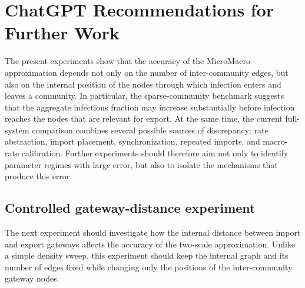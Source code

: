 \documentclass[12pt,a4paper]{article}
\begin{document}











\appendix

\section{ChatGPT Recommendations for Further Work}
\label{app:chatgpt_recommendations}

The present experiments show that the accuracy of the MicroMacro approximation depends not only on the number of inter-community edges, but also on the internal position of the nodes through which infection enters and leaves a community. In particular, the sparse-community benchmark suggests that the aggregate infectious fraction may increase substantially before infection reaches the nodes that are relevant for export. At the same time, the current full-system comparison combines several possible sources of discrepancy: rate abstraction, import placement, synchronization, repeated imports, and macro-rate calibration. Further experiments should therefore aim not only to identify parameter regimes with large error, but also to isolate the mechanisms that produce this error.

\subsection{Controlled gateway-distance experiment}

The next experiment should investigate how the internal distance between import and export gateways affects the accuracy of the two-scale approximation. Unlike a simple density sweep, this experiment should keep the internal graph and its number of edges fixed while changing only the positions of the inter-community gateway nodes.
\end{document}
